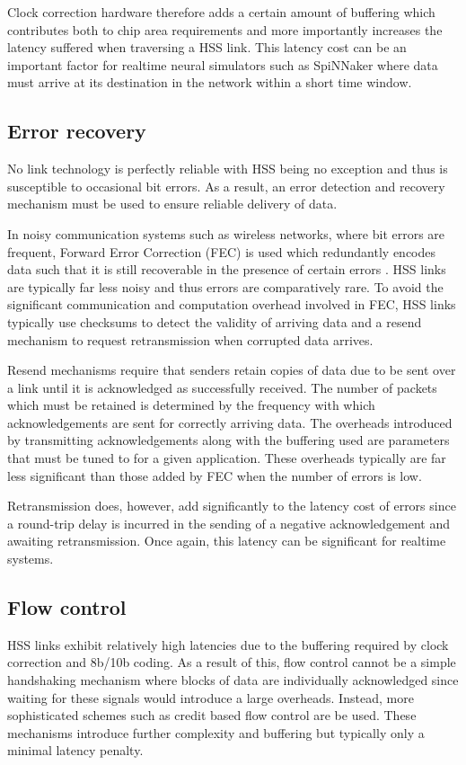 			Clock correction hardware therefore adds a certain amount of buffering
			which contributes both to chip area requirements and more importantly
			increases the latency suffered when traversing a HSS link. This latency
			cost can be an important factor for realtime neural simulators such as
			SpiNNaker where data must arrive at its destination in the network within
			a short time window.
		
		\subsection{Error recovery}
			
			No link technology is perfectly reliable with HSS being no exception and
			thus is susceptible to occasional bit errors. As a result, an error
			detection and recovery mechanism must be used to ensure reliable delivery
			of data.
			
			In noisy communication systems such as wireless networks, where bit errors
			are frequent, Forward Error Correction (FEC) is used which redundantly
			encodes data such that it is still recoverable in the presence of certain
			errors \cite{hamming50}. HSS links are typically far less noisy and thus
			errors are comparatively rare.  To avoid the significant communication and
			computation overhead involved in FEC, HSS links typically use checksums to
			detect the validity of arriving data and a resend mechanism to request
			retransmission when corrupted data arrives.
			
			Resend mechanisms require that senders retain copies of data due to be
			sent over a link until it is acknowledged as successfully received. The
			number of packets which must be retained is determined by the frequency
			with which acknowledgements are sent for correctly arriving data. The
			overheads introduced by transmitting acknowledgements along with the
			buffering used are parameters that must be tuned to for a given
			application. These overheads typically are far less significant than those
			added by FEC when the number of errors is low.
			
			Retransmission does, however, add significantly to the latency cost of
			errors since a round-trip delay is incurred in the sending of a negative
			acknowledgement and awaiting retransmission. Once again, this latency can
			be significant for realtime systems.
		
		\subsection{Flow control}
			
			HSS links exhibit relatively high latencies due to the buffering required
			by clock correction and 8b/10b coding. As a result of this, flow control
			cannot be a simple handshaking mechanism where blocks of data are
			individually acknowledged since waiting for these signals would introduce
			a large overheads. Instead, more sophisticated schemes such as credit
			based flow control \cite{dally04} are be used.  These mechanisms introduce
			further complexity and buffering but typically only a minimal latency
			penalty.
